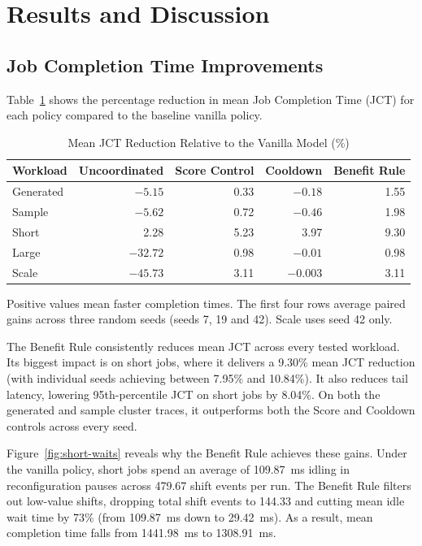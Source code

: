 \documentclass[conference]{IEEEtran}
\begin{document}
\section{Results and Discussion}
\label{sec:results}

\subsection{Job Completion Time Improvements}

Table~\ref{tab:policy-gains} shows the percentage reduction in mean Job Completion Time (JCT) for each policy compared to the baseline vanilla policy.

\begin{table}[t]
\caption{Mean JCT Reduction Relative to the Vanilla Model (\%)}
\label{tab:policy-gains}
\centering
\begin{tabular}{lrrrr}
\hline
Workload & Uncoordinated & Score Control & Cooldown & Benefit Rule \\
\hline
Generated & $-5.15$ & 0.33 & $-0.18$ & 1.55 \\
Sample    & $-5.62$ & 0.72 & $-0.46$ & 1.98 \\
Short     & 2.28    & 5.23 & 3.97     & 9.30 \\
Large     & $-32.72$ & 0.98 & $-0.01$ & 0.98 \\
Scale     & $-45.73$ & 3.11 & $-0.003$ & 3.11 \\
\hline
\end{tabular}
\par\smallskip
\footnotesize Positive values mean faster completion times. The first four rows average paired gains across three random seeds (seeds 7, 19 and 42). Scale uses seed 42 only.
\end{table}

The Benefit Rule consistently reduces mean JCT across every tested workload. Its biggest impact is on short jobs, where it delivers a 9.30\% mean JCT reduction (with individual seeds achieving between 7.95\% and 10.84\%). It also reduces tail latency, lowering 95th-percentile JCT on short jobs by 8.04\%. On both the generated and sample cluster traces, it outperforms both the Score and Cooldown controls across every seed.

Figure~\ref{fig:short-waits} reveals why the Benefit Rule achieves these gains. Under the vanilla policy, short jobs spend an average of 109.87~ms idling in reconfiguration pauses across 479.67 shift events per run. The Benefit Rule filters out low-value shifts, dropping total shift events to 144.33 and cutting mean idle wait time by 73\% (from 109.87~ms down to 29.42~ms). As a result, mean completion time falls from 1441.98~ms to 1308.91~ms.
\end{document}
